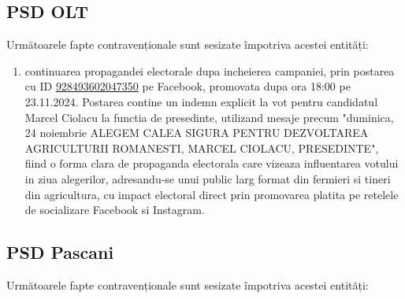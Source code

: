 \documentclass[a4paper,12pt]{article}
\begin{document}
\vspace{0.5cm}

\subsection{PSD OLT}
Următoarele fapte contravenționale sunt sesizate împotriva acestei entități:

\begin{enumerate}[leftmargin=*, label=\arabic*.)]
    \item continuarea propagandei electorale dupa incheierea campaniei, prin postarea cu ID \href{https://www.facebook.com/ads/library/?id=928493602047350}{928493602047350} pe Facebook, promovata dupa ora 18:00 pe 23.11.2024. Postarea contine un indemn explicit la vot pentru candidatul Marcel Ciolacu la functia de presedinte, utilizand mesaje precum "duminica, 24 noiembrie ALEGEM CALEA SIGURA PENTRU DEZVOLTAREA AGRICULTURII ROMANESTI, MARCEL CIOLACU, PRESEDINTE", fiind o forma clara de propaganda electorala care vizeaza influentarea votului in ziua alegerilor, adresandu-se unui public larg format din fermieri si tineri din agricultura, cu impact electoral direct prin promovarea platita pe retelele de socializare Facebook si Instagram.
\end{enumerate}

\vspace{0.5cm}

\subsection{PSD Pascani}
Următoarele fapte contravenționale sunt sesizate împotriva acestei entități:
\end{document}
